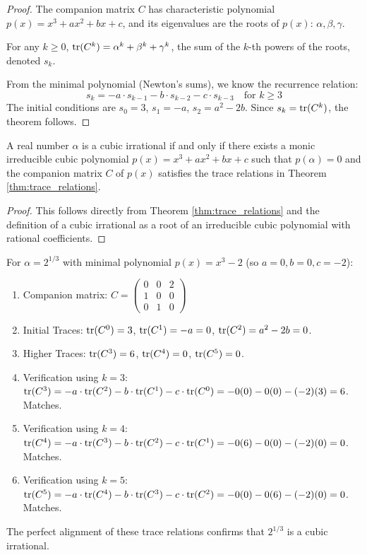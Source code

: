 \begin{proof}
The companion matrix $C$ has characteristic polynomial $p(x) = x^3 + ax^2 + bx + c$, and its eigenvalues are the roots of $p(x)$: $\alpha, \beta, \gamma$.

For any $k \geq 0$, $\operatorname{tr}(C^k) = \alpha^k + \beta^k + \gamma^k$, the sum of the $k$-th powers of the roots, denoted $s_k$.

From the minimal polynomial (Newton's sums), we know the recurrence relation:
\begin{equation}
s_k = -a \cdot s_{k-1} - b \cdot s_{k-2} - c \cdot s_{k-3} \quad \text{for } k \geq 3
\end{equation}
The initial conditions are $s_0 = 3$, $s_1 = -a$, $s_2 = a^2 - 2b$. 
Since $s_k = \operatorname{tr}(C^k)$, the theorem follows.
\end{proof}

\begin{corollary}\label{cor:matrix_characterization_trace}
A real number $\alpha$ is a cubic irrational if and only if there exists a monic irreducible cubic polynomial $p(x) = x^3 + ax^2 + bx + c$ such that $p(\alpha) = 0$ and the companion matrix $C$ of $p(x)$ satisfies the trace relations in Theorem \ref{thm:trace_relations}.
\end{corollary}

\begin{proof}
This follows directly from Theorem \ref{thm:trace_relations} and the definition of a cubic irrational as a root of an irreducible cubic polynomial with rational coefficients.
\end{proof}

\begin{example}
For $\alpha = 2^{1/3}$ with minimal polynomial $p(x) = x^3 - 2$ (so $a=0, b=0, c=-2$):
\begin{enumerate}
    \item Companion matrix: $C = \begin{pmatrix} 0 & 0 & 2 \\ 1 & 0 & 0 \\ 0 & 1 & 0 \end{pmatrix}$
    \item Initial Traces: $\operatorname{tr}(C^0) = 3$, $\operatorname{tr}(C^1) = -a = 0$, $\operatorname{tr}(C^2) = a^2-2b = 0$. 
    \item Higher Traces: $\operatorname{tr}(C^3) = 6$, $\operatorname{tr}(C^4) = 0$, $\operatorname{tr}(C^5) = 0$.
    \item Verification using $k=3$: $\operatorname{tr}(C^3) = -a \cdot \operatorname{tr}(C^2) - b \cdot \operatorname{tr}(C^1) - c \cdot \operatorname{tr}(C^0) = -0(0) - 0(0) - (-2)(3) = 6$. Matches.
    \item Verification using $k=4$: $\operatorname{tr}(C^4) = -a \cdot \operatorname{tr}(C^3) - b \cdot \operatorname{tr}(C^2) - c \cdot \operatorname{tr}(C^1) = -0(6) - 0(0) - (-2)(0) = 0$. Matches.
    \item Verification using $k=5$: $\operatorname{tr}(C^5) = -a \cdot \operatorname{tr}(C^4) - b \cdot \operatorname{tr}(C^3) - c \cdot \operatorname{tr}(C^2) = -0(0) - 0(6) - (-2)(0) = 0$. Matches.
\end{enumerate}
The perfect alignment of these trace relations confirms that $2^{1/3}$ is a cubic irrational.
\end{example}

